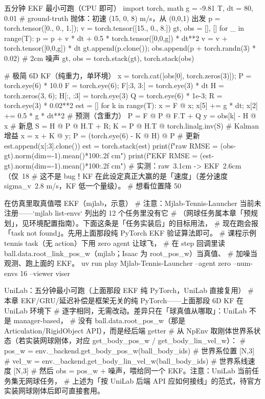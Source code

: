 \begin{codebox}[Python]{五分钟 EKF 最小可跑（CPU 即可）}
import torch, math
g = -9.81
T, dt = 80, 0.01
# ground-truth 抛体：初速 (15, 0, 8) m/s，从 (0,0,1) 出发
p = torch.tensor([0., 0., 1.]); v = torch.tensor([15., 0., 8.])
gt, obs = [], []
for _ in range(T):
    p = p + v * dt + 0.5 * torch.tensor([0,0,g]) * dt**2
    v = v + torch.tensor([0,0,g]) * dt
    gt.append(p.clone()); obs.append(p + torch.randn(3) * 0.02)   # 2cm 噪声
gt, obs = torch.stack(gt), torch.stack(obs)

# 极简 6D KF（纯重力，单环境）
x = torch.cat([obs[0], torch.zeros(3)]); P = torch.eye(6) * 10.0
F = torch.eye(6); F[:3, 3:] = torch.eye(3) * dt
H = torch.zeros(3, 6); H[:, :3] = torch.eye(3)
Q = torch.eye(6) * 1e-3; R = torch.eye(3) * 0.02**2
est = []
for k in range(T):
    x = F @ x; x[5] += g * dt; x[2] += 0.5 * g * dt**2     # 预测（含重力）
    P = F @ P @ F.T + Q
    y = obs[k] - H @ x                                       # 新息
    S = H @ P @ H.T + R; K = P @ H.T @ torch.linalg.inv(S)  # Kalman 增益
    x = x + K @ y; P = (torch.eye(6) - K @ H) @ P            # 更新
    est.append(x[:3].clone())
est = torch.stack(est)
print(f"raw  RMSE = {(obs-gt).norm(dim=-1).mean()*100:.2f} cm")
print(f"EKF  RMSE = {(est-gt).norm(dim=-1).mean()*100:.2f} cm")
# 实测：raw~3.1cm -> EKF~2.6cm（仅~18%
# 这不是 bug！KF 在此设定真正大赢的是「速度」（差分速度 sigma_v~2.8 m/s，KF 低一个量级）。
# 想看位置降 50%
\end{codebox}

\begin{codebox}[bash]{在仿真里取真值喂 EKF（mjlab，示意）}
# 注意：Mjlab-Tennis-Launcher 当前未注册——`mjlab list-envs` 列出的 12 个任务里没有它
# （网球任务属本章「预规划」，见环境配置指南）。下面这条是「任务实装后」的目标用法，
# 现在跑会报「task not found」。先用上面那段纯 PyTorch EKF 验证算法即可。
# 课程示例 tennis task（无 action）下用 zero agent 让球飞，
# 在 step 回调里读 ball.data.root_link_pos_w（mjlab；Isaac 为 root_pos_w）当真值、
# 加噪当观测、跑上面的 EKF。
uv run play Mjlab-Tennis-Launcher --agent zero --num-envs 16 --viewer viser
\end{codebox}

\begin{codebox}[Python]{UniLab：五分钟最小可跑（上面那段 EKF 纯 PyTorch，UniLab 直接复用）}
# 本章 EKF/GRU/延迟补偿是框架无关的纯 PyTorch——上面那段 6D KF 在 UniLab 环境下
# 逐字相同，无需改动。差异只在「球真值从哪取」：UniLab 不是 manager-based，
# 没有 ball.data.root_pos_w（那是 Articulation/RigidObject API），而是经后端 getter
# 从 NpEnv 取刚体世界系状态（若实装网球刚体，对应 get_body_pos_w / get_body_lin_vel_w）：
#   pos_w = env._backend.get_body_pos_w(ball_body_ids)      # 世界系位置 [N,3]
#   vel_w = env._backend.get_body_lin_vel_w(ball_body_ids)  # 世界系线速度 [N,3]
# 然后 obs = pos_w + 噪声，喂给同一个 EKF。注意：UniLab 当前任务集无网球任务，
# 上述为「按 UniLab 后端 API 应如何接线」的范式，待官方实装网球刚体后即可直接套用。
\end{codebox}

